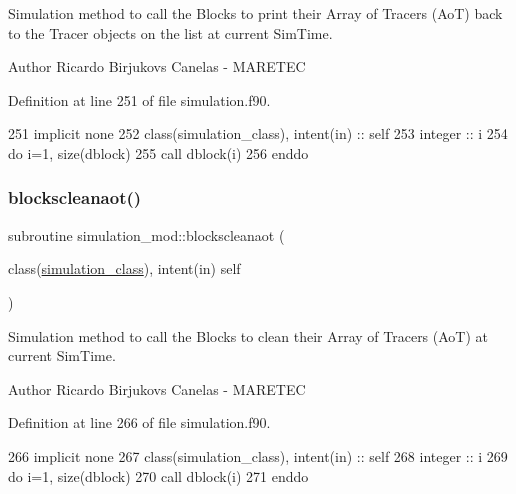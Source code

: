 Simulation method to call the Blocks to print their Array of Tracers (AoT) back to the Tracer objects on the list at current Sim\+Time. 

\begin{DoxyAuthor}{Author}
Ricardo Birjukovs Canelas -\/ M\+A\+R\+E\+T\+EC 
\end{DoxyAuthor}


Definition at line 251 of file simulation.\+f90.


\begin{DoxyCode}
251     \textcolor{keywordtype}{implicit none}
252     \textcolor{keywordtype}{class}(simulation\_class), \textcolor{keywordtype}{intent(in)} :: self
253     \textcolor{keywordtype}{integer} :: i
254     \textcolor{keywordflow}{do} i=1, \textcolor{keyword}{size}(dblock)
255         \textcolor{keyword}{call }dblock(i)%
256 \textcolor{keywordflow}{    enddo}
\end{DoxyCode}
\mbox{\label{namespacesimulation__mod_a9c7e093e5cf65d3414f9a8cf8beab611}} 
\subsubsection{\texorpdfstring{blockscleanaot()}{blockscleanaot()}}
{\footnotesize\ttfamily subroutine simulation\+\_\+mod\+::blockscleanaot (\begin{DoxyParamCaption}\item[{class(\mbox{\hyperlink{structsimulation__mod_1_1simulation__class}{simulation\+\_\+class}}), intent(in)}]{self }\end{DoxyParamCaption})\hspace{0.3cm}{\ttfamily [private]}}



Simulation method to call the Blocks to clean their Array of Tracers (AoT) at current Sim\+Time. 

\begin{DoxyAuthor}{Author}
Ricardo Birjukovs Canelas -\/ M\+A\+R\+E\+T\+EC 
\end{DoxyAuthor}


Definition at line 266 of file simulation.\+f90.


\begin{DoxyCode}
266     \textcolor{keywordtype}{implicit none}
267     \textcolor{keywordtype}{class}(simulation\_class), \textcolor{keywordtype}{intent(in)} :: self
268     \textcolor{keywordtype}{integer} :: i
269     \textcolor{keywordflow}{do} i=1, \textcolor{keyword}{size}(dblock)
270         \textcolor{keyword}{call }dblock(i)%
271 \textcolor{keywordflow}{    enddo}
\end{DoxyCode}
\mbox{\label{namespacesimulation__mod_ac838d4afe33303dc49a5790ca957baa1}} 
